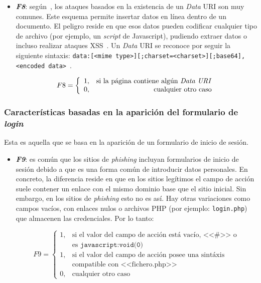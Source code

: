 \begin{itemize}
	\item \textit{\textbf{F8}}: según~\cite{featuresPhishing2018Gupta}, los ataques basados en la existencia de un \textit{Data} URI son muy comunes. Este esquema permite insertar datos en línea dentro de un documento. El peligro reside en que esos datos pueden codificar cualquier tipo de archivo (por ejemplo, un \textit{script} de Javascript), pudiendo extraer datos o incluso realizar ataques XSS~\cite{dataUri2020neoguias}. Un \textit{Data} URI se reconoce por seguir la siguiente sintaxis: \texttt{data:[<mime type>][;charset=<charset>][;base64],<encoded data>}~\cite{dataUri2010csstrick}.
	
	\[F8 = \left\{ \begin{array}{lr} 1, & \text{si la página contiene algún \textit{Data URI}}\\ 
	0, & \text{\raggedright cualquier otro caso} \label{eqn:phishing_f8} \end{array} \right. \]
	\end{itemize}

\subsubsection{Características basadas en la aparición del formulario de \textit{login}}
Esta es aquella que se basa en la aparición de un formulario de inicio de sesión.

\begin{itemize}
	\item \textit{\textbf{F9}}: es común que los sitios de \textit{phishing} incluyan formularios de inicio de sesión debido a que es una forma común de introducir datos personales. En concreto, la diferencia reside en que en los sitios legítimos el campo de acción suele contener un enlace con el mismo dominio base que el sitio inicial. Sin embargo, en los sitios de \textit{phishing} esto no es así. Hay otras variaciones como campos vacíos, con enlaces nulos o archivos PHP (por ejemplo: \texttt{login.php}) que almacenen las credenciales. Por lo tanto:

	\[F9 = \left\{ \begin{array}{lr} 1, & \text{si el valor del campo de acción está vacío, <<\#>> o}\\ & \text{es } \texttt{javascript:void(0)}\\ 
	1, & \text{si el valor del campo de acción posee una sintáxis} \\ &  \text{compatible con <<fichero.php>>} \\
	0, & \text{cualquier otro caso} \label{eqn:phishing_f9} \end{array} \right. \]
\end{itemize}

